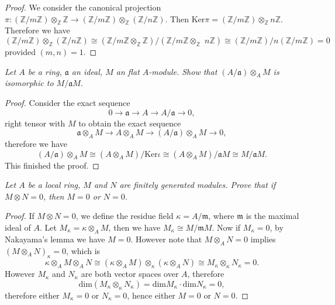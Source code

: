 \begin{proof}
We consider the canonical projection $\pi:(\mathbb{Z}/m\mathbb{Z})\otimes_\mathbb{Z}\mathbb{Z}\to(\mathbb{Z}/m\mathbb{Z})\otimes_\mathbb{Z}(\mathbb{Z}/n\mathbb{Z})$. Then $\mathrm{Ker}\pi=(\mathbb{Z}/m\mathbb{Z})\otimes_\mathbb{Z}n\mathbb{Z}$. Therefore we have 
$$
\left( \mathbb{Z} /m\mathbb{Z} \right) \otimes _{\mathbb{Z}}\left( \mathbb{Z} /n\mathbb{Z} \right) \cong \left( \mathbb{Z} /m\mathbb{Z} \otimes _{\mathbb{Z}}\mathbb{Z} \right) /\left( \mathbb{Z} /m\mathbb{Z} \otimes _{\mathbb{Z}}\,\,n\mathbb{Z} \right) \cong \left( \mathbb{Z} /m\mathbb{Z} \right) /n\left( \mathbb{Z} /m\mathbb{Z} \right) =0
$$
provided $(m,n)=1$.
\end{proof}
\begin{problem}\em
Let $A$ be a ring, $\mathfrak{a}$ an ideal, $M$ an flat $A$-module. Show that $(A/\mathfrak{a})\otimes_AM$ is isomorphic to $M/\mathfrak{a}M$.
\end{problem}
\begin{proof}
Consider the exact sequence 
$$
0\longrightarrow \mathfrak{a} \longrightarrow A\longrightarrow A/\mathfrak{a} \longrightarrow 0,
$$
right tensor with $M$ to obtain the exact sequence 
$$
\mathfrak{a} \otimes _AM\longrightarrow A\otimes _AM\longrightarrow \left( A/\mathfrak{a} \right) \otimes _AM\longrightarrow 0,
$$
therefore we have 
$$
\left( A/\mathfrak{a} \right) \otimes _AM\cong \left( A\otimes _AM \right) /\mathrm{Ker}\iota \cong \left( A\otimes _AM \right) /\mathfrak{a} M\cong M/\mathfrak{a} M.
$$
This finished the proof.
\end{proof}
\begin{problem}\em
Let $A$ be a local ring, $M$ and $N$ are finitely generated modules. Prove that if $M\otimes N=0$, then $M=0$ or $N=0$.
\end{problem}
\begin{proof}
If $M\otimes N=0$, we define the residue field $\kappa=A/\mathfrak{m}$, where $\mathfrak{m}$ is the maximal ideal of $A$. Let $M_\kappa=\kappa\otimes_AM$, then we have $M_\kappa\cong M/\mathfrak{m}M$. Now if $M_\kappa=0$, by Nakayama's lemma we have $M=0$. However note that $M\otimes_AN=0$ implies $(M\otimes_AN)_\kappa=0$, which is 
$$
\kappa \otimes _AM\otimes _AN\cong \left( \kappa \otimes _AM \right) \otimes _{\kappa}\left( \kappa \otimes _AN \right) \cong M_{\kappa}\otimes _{\kappa}N_{\kappa}=0.
$$
However $M_\kappa$ and $N_\kappa$ are both vector spaces over $A$, therefore 
$$
\mathrm{dim}\left( M_{\kappa}\otimes _{\kappa}N_{\kappa} \right) =\mathrm{dim}M_{\kappa}\cdot \mathrm{dim}N_{\kappa}=0,
$$
therefore either $M_\kappa=0$ or $N_\kappa=0$, hence either $M=0$ or $N=0$.
\end{proof}
